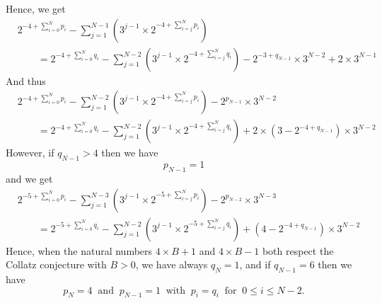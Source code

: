 \documentclass[11pt,a4paper]{article}
\theoremstyle{definition}
\begin{document}
Hence, we get
\begin{equation}
\begin{split}
&2^{-4+\sum_{i=0}^{N}p_i}-\sum_{j=1}^{N-1}\left(3^{j-1}\times 2^{-4+\sum_{i=j}^{N}p_i}\right)\\
&\qquad=2^{-4+\sum_{i=0}^{N}q_i}-\sum_{j=1}^{N-2}\left(3^{j-1}\times 2^{-4+\sum_{i=j}^{N}q_i}\right)-2^{-3+q_{N-1}}\times 3^{N-2}+2\times 3^{N-1}
\end{split}
\end{equation}
And thus
\begin{equation}
\begin{split}
&2^{-4+\sum_{i=0}^{N}p_i}-\sum_{j=1}^{N-2}\left(3^{j-1}\times 2^{-4+\sum_{i=j}^{N}p_i}\right)-2^{p_{N-1}}\times 3^{N-2}\\
&\qquad=2^{-4+\sum_{i=0}^{N}q_i}-\sum_{j=1}^{N-2}\left(3^{j-1}\times 2^{-4+\sum_{i=j}^{N}q_i}\right)+2\times\left(3-2^{-4+q_{N-1}}\right)\times 3^{N-2}
\end{split}
\end{equation}
However, if $q_{N-1}>4$ then we have
\begin{equation}
p_{N-1}=1
\end{equation}
and we get
\begin{equation}
\begin{split}
&2^{-5+\sum_{i=0}^{N}p_i}-\sum_{j=1}^{N-3}\left(3^{j-1}\times 2^{-5+\sum_{i=j}^{N}p_i}\right)-2^{p_{N-2}}\times 3^{N-3}\\
&\qquad=2^{-5+\sum_{i=0}^{N}q_i}-\sum_{j=1}^{N-2}\left(3^{j-1}\times 2^{-5+\sum_{i=j}^{N}q_i}\right)+\left(4-2^{-4+q_{N-1}}\right)\times 3^{N-2}
\end{split}
\end{equation}
Hence, when the natural numbers $4\times B+1$ and $4\times B-1$ both respect the Collatz
conjecture with $B>0$, we have always $q_N=1$, and if $q_{N-1}=6$ then we have
\begin{equation}
p_N=4\ \text{ and }\ p_{N-1}=1\ \text{ with }\ p_i=q_i\ \text{ for }\ 0\le i\le N-2.
\end{equation}
\end{document}
